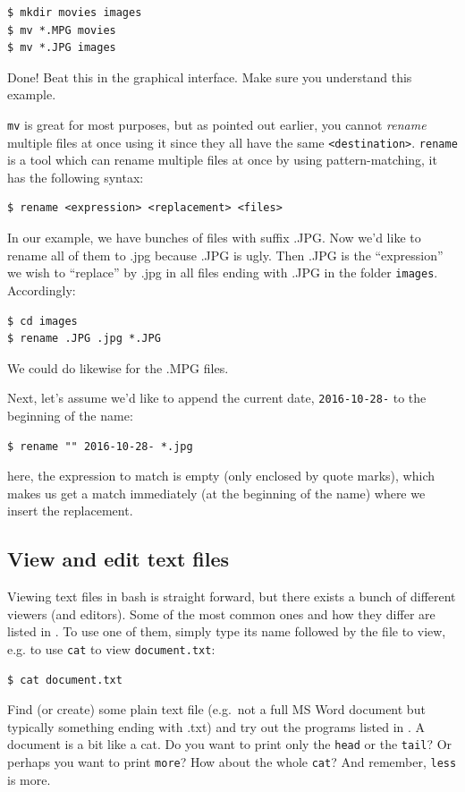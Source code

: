 \begin{verbatim}
$ mkdir movies images
$ mv *.MPG movies
$ mv *.JPG images
\end{verbatim}
Done! Beat this in the graphical interface. Make sure you understand this example.

\verb|mv| is great for most purposes, but as pointed out earlier, you cannot \emph{rename} multiple files at once using it since they all have the same \verb|<destination>|. \verb|rename| is a tool which can rename multiple files at once by using pattern-matching, it has the following syntax:

\begin{verbatim}
$ rename <expression> <replacement> <files>
\end{verbatim}
In our example, we have bunches of files with suffix .JPG. Now we'd like to rename all of them to .jpg because .JPG is ugly. Then .JPG is the ``expression'' we wish to ``replace'' by .jpg in all files ending with .JPG in the folder \verb|images|. Accordingly:

\begin{verbatim}
$ cd images
$ rename .JPG .jpg *.JPG
\end{verbatim}
We could do likewise for the .MPG files.

Next, let's assume we'd like to append the current date, \verb|2016-10-28-| to the beginning of the name:

\begin{verbatim}
$ rename "" 2016-10-28- *.jpg
\end{verbatim}
here, the expression to match is empty (only enclosed by quote marks), which makes us get a match immediately (at the beginning of the name) where we insert the replacement.

\subsection{View and edit text files}
Viewing text files in bash is straight forward, but there exists a bunch of different viewers (and editors). Some of the most common ones and how they differ are listed in . To use one of them, simply type its name followed by the file to view, e.g. to use \verb|cat| to view \verb|document.txt|:

\begin{verbatim}
$ cat document.txt
\end{verbatim}
Find (or create) some plain text file (e.g.\ not a full MS Word document but typically something ending with .txt) and try out the programs listed in . A document is a bit like a cat. Do you want to print only the \verb|head| or the \verb|tail|? Or perhaps you want to print \verb|more|? How about the whole \verb|cat|? And remember, \verb|less| is more.

